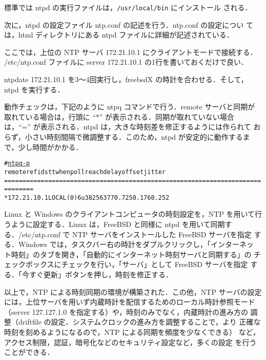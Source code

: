 標準では ntpd の実行ファイルは，\texttt{/usr/local/bin} にインストール
される．

次に，ntpd の設定ファイル ntp.conf の記述を行う．ntp.conf の設定につい
ては，html ディレクトリにある ntpd ファイルに詳細が記述されている．

ここでは，上位の NTP サーバ 172.21.10.1 にクライアントモードで接続する．
/etc/ntp.conf ファイルに server 172.21.10.1 の1行を書いておくだけで良い．

ntpdate 172.21.10.1 を3〜4回実行し，freebsdX の時計を合わせる．そして，
ntpd を実行する．

動作チェックは，下記のように ntpq コマンドで行う．remote サーバと同期が
取れている場合は，行頭に ``*'' が表示される．同期が取れていない場合
は，``='' が表示される．ntpd は，大きな時刻差を修正するようには作られて
おらず，小さい時刻間隔で微調整する．このため，ntpd が安定的に動作するま
で，少し時間がかかる．
\begin{center}
\begin{breakbox}
\begin{alltt}
# \underline{ntpq -p}
     remote           refid      st t when poll reach   delay   offset  jitter
==============================================================================
*172.21.10.1     LOCAL(0)         6 u   38  256  377    0.725    0.176   0.252
\end{alltt}
\end{breakbox}
\end{center}

Linux と Windows のクライアントコンピュータの時刻設定を，NTP を用いて行
うように設定する．Linux は，FreeBSD と同様に ntpd を用いて同期す
る．/etc/ntp.conf で NTP サーバをインストールした FreeBSD サーバを指定
する．Windows では，タスクバー右の時計をダブルクリックし，「インターネッ
ト時刻」のタブを開き，「自動的にインターネット時刻サーバと同期する」の
チェックボックスにチェックを行い，「サーバ」として FreeBSD サーバを指定
する．「今すぐ更新」ボタンを押し，時刻を修正する．

以上で，NTP による時刻同期の環境が構築された．この他，NTP サーバの設定
には，上位サーバを用いず内蔵時計を配信するためのローカル時計参照モード
（server 127.127.1.0 を指定する）や，時刻のみでなく，内蔵時計の進み方の
調整（driftfile の設定．システムクロックの進み方を調整することで，より
正確な時刻を刻めるようになるので，NTP による同期を頻度を少なくできる）
など，アクセス制限，認証，暗号化などのセキュリティ設定など，多くの設定
を行うことができる．

